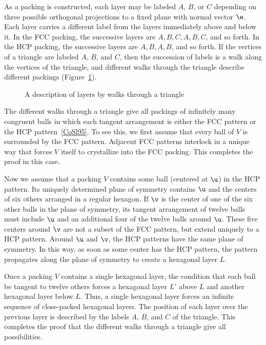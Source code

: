 As a packing is constructed, each layer may be labeled
$A$, $B$, or $C$ depending on three possible orthogonal projections to a fixed plane
with normal vector $\e$.
Each layer carries a different label from the layers immediately
above and below it.  In the FCC packing, the successive layers are
$A,B,C,A,B,C$, and so forth.  In the HCP packing, the successive layers are
$A,B,A,B$, and so forth.  If the vertices of a triangle are labeled $A$, $B$, and $C$,
then the succession of labels is a
walk along the vertices of the triangle, and different walks through the
triangle describe different packings (Figure~\ref{fig:fcc-tri}).

\begin{figure}[htb]
  \centering
  \caption{A description of layers by walks through a triangle}
  \label{fig:fcc-tri}
\end{figure}

The different walks through a triangle give all packings of infinitely
many congruent balls in which each tangent arrangement is
either the FCC pattern  or the HCP pattern~\ref{CoSl95}.  To see
this, we first assume that every ball of $V$ is surrounded by the FCC pattern.  
Adjacent FCC patterns interlock in a unique way
that forces $V$ itself to crystallize into the
FCC packing.  This completes the proof in this case.

Now we assume that a packing $V$ contains some ball (centered at $\u$)
in the HCP pattern. Its uniquely determined
plane of symmetry contains $\u$ and the centers of six
others arranged in a regular hexagon. If $\v$ is the center of one of
the six other balls in the plane of symmetry, its  tangent arrangement
of twelve balls must include $\u$ and an additional four of the
twelve balls around $\u$. These five centers around $\v$ are not a
subset of the FCC pattern, but  extend uniquely to
a HCP pattern.   Around $\u$ and $\v$, the HCP patterns  have the same
plane of symmetry. In this way, as
soon as some center has the HCP pattern, the pattern
propagates along the plane of symmetry to create a hexagonal layer
$L$.

Once a packing $V$ contains a single hexagonal layer, the condition
that each ball be tangent to twelve others forces a hexagonal layer
$L'$ above $L$ and another hexagonal layer below $L$.  Thus, a single
hexagonal layer forces an infinite sequence of close-packed hexagonal
layers.  The position of each layer over the previous layer is described 
by the labels $A$, $B$, and $C$ of the triangle.
This completes the proof that the different walks through a triangle give
all possibilities.



